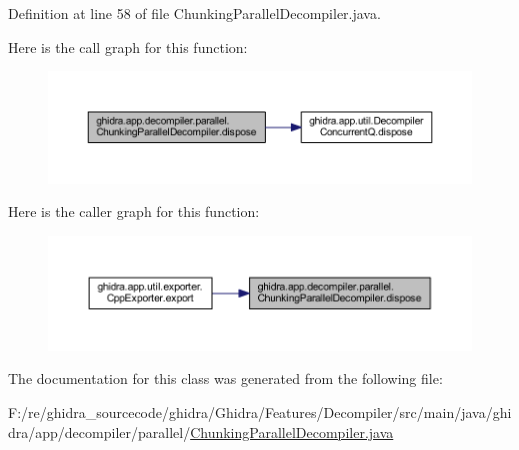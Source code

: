 Definition at line 58 of file Chunking\+Parallel\+Decompiler.\+java.

Here is the call graph for this function\+:
\nopagebreak
\begin{figure}[H]
\begin{center}
\leavevmode
\includegraphics[width=350pt]{classghidra_1_1app_1_1decompiler_1_1parallel_1_1_chunking_parallel_decompiler_a3035ca3f34788eeecfad2b5f1116d0e4_cgraph}
\end{center}
\end{figure}
Here is the caller graph for this function\+:
\nopagebreak
\begin{figure}[H]
\begin{center}
\leavevmode
\includegraphics[width=350pt]{classghidra_1_1app_1_1decompiler_1_1parallel_1_1_chunking_parallel_decompiler_a3035ca3f34788eeecfad2b5f1116d0e4_icgraph}
\end{center}
\end{figure}


The documentation for this class was generated from the following file\+:\begin{DoxyCompactItemize}
\item 
F\+:/re/ghidra\+\_\+sourcecode/ghidra/\+Ghidra/\+Features/\+Decompiler/src/main/java/ghidra/app/decompiler/parallel/\mbox{\hyperlink{_chunking_parallel_decompiler_8java}{Chunking\+Parallel\+Decompiler.\+java}}\end{DoxyCompactItemize}

